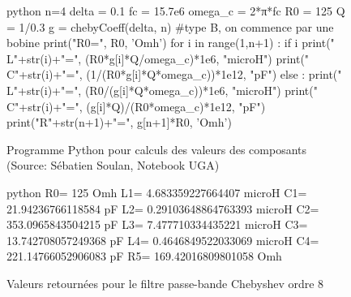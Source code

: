 \begin{itemize}
    \begin{figure}[!htbp]
        \begin{mintedbox}{python}
n=4
delta = 0.1
fc = 15.7e6
omega_c = 2*π*fc
R0 = 125
Q = 1/0.3
g = chebyCoeff(delta, n)
#type B, on commence par une bobine
print("R0=", R0, 'Omh')
for i in range(1,n+1) :
    if i %
        print("  L"+str(i)+"=", (R0*g[i]*Q/omega_c)*1e6, "microH")
        print("  C"+str(i)+"=", (1/(R0*g[i]*Q*omega_c))*1e12, "pF")
    else :
        print("  L"+str(i)+"=", (R0/(g[i]*Q*omega_c))*1e6, "microH")
        print("  C"+str(i)+"=", (g[i]*Q)/(R0*omega_c)*1e12, "pF")
        print("R"+str(n+1)+"=", g[n+1]*R0, 'Omh')\end{mintedbox}
        \caption{Programme Python pour calculs des valeurs des composants (Source: Sébatien Soulan, Notebook UGA)}
    \end{figure}
        \FloatBarrier
    \begin{figure}[!htbp]
        \begin{mintedbox}{python}
R0= 125 Omh
  L1= 4.683359227664407 microH
  C1= 21.94236766118584 pF
  L2= 0.29103648864763393 microH
  C2= 353.0965843504215 pF
  L3= 7.477710334435221 microH
  C3= 13.742708057249368 pF
  L4= 0.4646849522033069 microH
  C4= 221.14766052906083 pF
R5= 169.42016809801058 Omh\end{mintedbox}
        \caption{Valeurs retournées pour le filtre passe-bande Chebyshev ordre 8}
        \end{figure}
        \FloatBarrier
\end{itemize}

